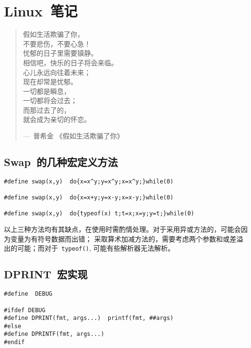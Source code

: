 \chapter{Linux~笔记}

\begin{center}
\begin{quotation}
假如生活欺骗了你，\\
不要悲伤，不要心急！\\
忧郁的日子里需要镇静。\\
相信吧，快乐的日子将会来临。\\
心儿永远向往着未来；\\
现在却常是忧郁。\\
一切都是瞬息，\\
一切都将会过去；\\
而那过去了的，\\
就会成为亲切的怀恋。\\
\begin{flushright}
---~普希金 《假如生活欺骗了你》
\end{flushright}
\end{quotation}
\end{center}

\section{Swap~的几种宏定义方法}
\label{sec:swap}
\begin{verbatim}
#define swap(x,y)  do{x=x^y;y=x^y;x=x^y;}while(0)

#define swap(x,y)  do{x=x+y;y=x-y;x=x-y;}while(0)

#define swap(x,y)  do{typeof(x) t;t=x;x=y;y=t;}while(0)
\end{verbatim}

以上三种方法均有其缺点，在使用时需酌情处理。对于采用异或方法的，可能会因为变量为有符号数据而出错； 采取算术加减方法的，需要考虑两个参数和或差溢出的可能；而对于~\verb|typeof()|, 可能有些解析器无法解析。

\section{DPRINT~宏实现}
\label{sec:dprint}
\begin{verbatim}
#define  DEBUG

#ifdef DEBUG
#define DPRINT(fmt, args...)  printf(fmt, ##args)
#else
#define DPRINTF(fmt, args...)
#endif
\end{verbatim}

